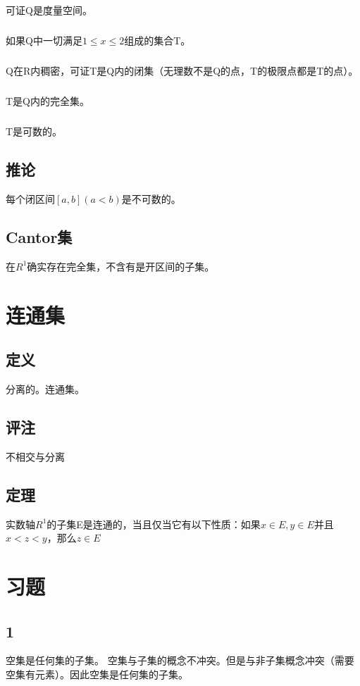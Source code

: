 \paragraph{}可证Q是度量空间。
\paragraph{}如果Q中一切满足$ 1 \le x \le 2 $组成的集合T。
\paragraph{}Q在R内稠密，可证T是Q内的闭集（无理数不是Q的点，T的极限点都是T的点）。
\paragraph{}T是Q内的完全集。
\paragraph{}T是可数的。
\section*{推论}每个闭区间$[a,b](a < b)$是不可数的。
\section{Cantor集} 在$R^1$确实存在完全集，不含有是开区间的子集。
\subparagraph*{}
\chapter*{连通集}
\section{定义} 分离的。连通集。
\section{评注} 不相交与分离
\section{定理} 实数轴$R^1$的子集E是连通的，当且仅当它有以下性质：如果$x \in E, y \in E $并且$x < z < y$，那么$ z \in E $
\subparagraph*{}
\chapter*{习题}
\section*{1} 空集是任何集的子集。
空集与子集的概念不冲突。但是与非子集概念冲突（需要空集有元素）。因此空集是任何集的子集。
